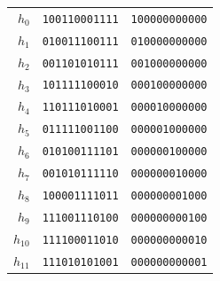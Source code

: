 \begin{tabular}{@{}r@{\;\;}c@{\;\;}c@{}}
$h_{0}$ & \texttt{100110001111} & \texttt{100000000000} \\
$h_{1}$ & \texttt{010011100111} & \texttt{010000000000} \\
$h_{2}$ & \texttt{001101010111} & \texttt{001000000000} \\
$h_{3}$ & \texttt{101111100010} & \texttt{000100000000} \\
$h_{4}$ & \texttt{110111010001} & \texttt{000010000000} \\
$h_{5}$ & \texttt{011111001100} & \texttt{000001000000} \\
$h_{6}$ & \texttt{010100111101} & \texttt{000000100000} \\
$h_{7}$ & \texttt{001010111110} & \texttt{000000010000} \\
$h_{8}$ & \texttt{100001111011} & \texttt{000000001000} \\
$h_{9}$ & \texttt{111001110100} & \texttt{000000000100} \\
$h_{10}$ & \texttt{111100011010} & \texttt{000000000010} \\
$h_{11}$ & \texttt{111010101001} & \texttt{000000000001} \\
\end{tabular}
